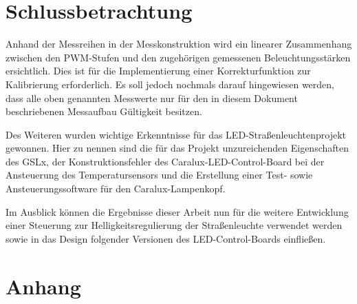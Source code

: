 \documentclass[a4paper,12pt]{scrartcl}
\begin{document}
\clearpage
\section{Schlussbetrachtung}
Anhand der Messreihen in der Messkonstruktion wird ein linearer Zusammenhang zwischen den PWM-Stufen und den zugehörigen gemessenen Beleuchtungsstärken ersichtlich. Dies ist für die Implementierung einer Korrekturfunktion zur Kalibrierung erforderlich. Es soll jedoch nochmals darauf hingewiesen werden, dass alle oben genannten Messwerte nur für den in diesem Dokument beschriebenen Messaufbau Gültigkeit besitzen.

Des Weiteren wurden wichtige Erkenntnisse für das LED-Straßenleuchtenprojekt gewonnen. Hier zu nennen sind die für das Projekt unzureichenden Eigenschaften des GSLx, der Konstruktionsfehler des Caralux-LED-Control-Board bei der Ansteuerung des Temperatursensors und die Erstellung einer Test- sowie Ansteuerungssoftware für den Caralux-Lampenkopf.

Im Ausblick können die Ergebnisse dieser Arbeit nun für die weitere Entwicklung einer Steuerung zur Helligkeitsregulierung der Straßenleuchte verwendet werden sowie in das Design folgender Versionen des LED-Control-Boards einfließen.

\section{Anhang}
\end{document}
